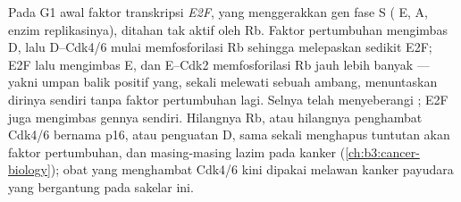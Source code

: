 \begin{proposition}\label{prop:b3:cell-cycle-apoptosis:rb}
Pada G1 awal faktor transkripsi \emph{E2F}, yang menggerakkan gen
fase S ( E,  A, enzim replikasinya), ditahan tak aktif oleh
\emph{} Rb. Faktor pertumbuhan mengimbas
 D, lalu  D--Cdk4/6 mulai memfosforilasi Rb sehingga melepaskan
sedikit E2F; E2F lalu mengimbas  E, dan  E--Cdk2 memfosforilasi
Rb jauh lebih banyak --- yakni umpan balik positif yang, sekali melewati
sebuah ambang, menuntaskan dirinya sendiri tanpa faktor pertumbuhan lagi.
Selnya telah menyeberangi ; E2F juga mengimbas gennya sendiri.
Hilangnya Rb, atau hilangnya penghambat Cdk4/6 bernama p16, atau penguatan
 D, sama sekali menghapus tuntutan akan faktor pertumbuhan, dan
masing-masing lazim pada kanker (\cref{ch:b3:cancer-biology}); obat yang
menghambat Cdk4/6 kini dipakai melawan kanker payudara yang bergantung pada
sakelar ini.
\end{proposition}

